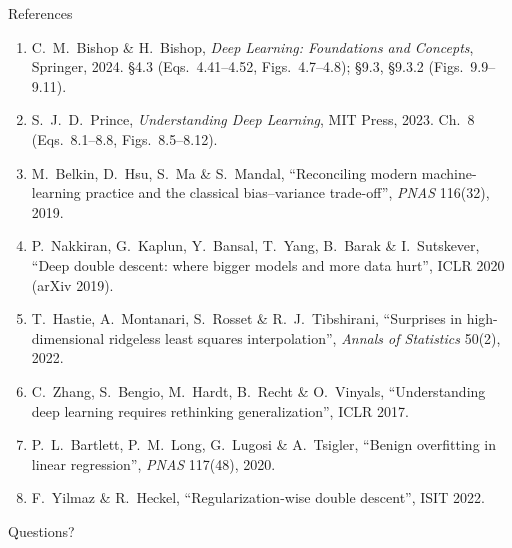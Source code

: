 \documentclass[aspectratio=169, 11pt]{beamer}
\newcommand{\nosrc}{}       %
\begin{document}
\begin{frame}[allowframebreaks]{References}
  \nosrc
  \vspace{0.3em}
  {\scriptsize
  \begin{enumerate}\itemsep0.30em
    \item C.\ M.\ Bishop \& H.\ Bishop, \emph{Deep Learning: Foundations
          and Concepts}, Springer, 2024. \S4.3 (Eqs.~4.41--4.52,
          Figs.~4.7--4.8); \S9.3, \S9.3.2 (Figs.~9.9--9.11).
    \item S.\ J.\ D.\ Prince, \emph{Understanding Deep Learning}, MIT
          Press, 2023. Ch.~8 (Eqs.~8.1--8.8, Figs.~8.5--8.12).
    \item M.\ Belkin, D.\ Hsu, S.\ Ma \& S.\ Mandal, ``Reconciling
          modern machine-learning practice and the classical
          bias--variance trade-off'', \emph{PNAS} 116(32), 2019.
    \item P.\ Nakkiran, G.\ Kaplun, Y.\ Bansal, T.\ Yang, B.\ Barak \&
          I.\ Sutskever, ``Deep double descent: where bigger models and
          more data hurt'', ICLR 2020 (arXiv 2019).
    \item T.\ Hastie, A.\ Montanari, S.\ Rosset \& R.\ J.\ Tibshirani,
          ``Surprises in high-dimensional ridgeless least squares
          interpolation'', \emph{Annals of Statistics} 50(2), 2022.
    \item C.\ Zhang, S.\ Bengio, M.\ Hardt, B.\ Recht \& O.\ Vinyals,
          ``Understanding deep learning requires rethinking
          generalization'', ICLR 2017.
    \item P.\ L.\ Bartlett, P.\ M.\ Long, G.\ Lugosi \& A.\ Tsigler,
          ``Benign overfitting in linear regression'', \emph{PNAS}
          117(48), 2020.
    \item F.\ Yilmaz \& R.\ Heckel, ``Regularization-wise double
          descent'', ISIT 2022.
  \end{enumerate}}
\end{frame}

\begin{frame}[standout]
  \nosrc
  Questions?
\end{frame}
\end{document}
